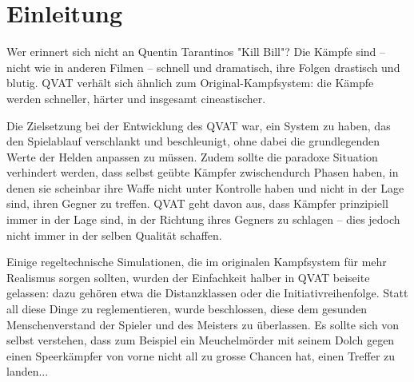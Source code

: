 %

\chapter{Einleitung}
Wer erinnert sich nicht an Quentin Tarantinos "Kill Bill"? Die Kämpfe sind – nicht wie in anderen Filmen – schnell und dramatisch, ihre Folgen drastisch und blutig. QVAT verhält sich ähnlich zum Original-Kampfsystem: die Kämpfe werden schneller, härter und insgesamt cineastischer.



Die Zielsetzung bei der Entwicklung des QVAT war, ein System zu haben, das den Spielablauf verschlankt und beschleunigt, ohne dabei die grundlegenden Werte der Helden anpassen zu müssen.
Zudem sollte die paradoxe Situation verhindert werden, dass selbst geübte Kämpfer zwischendurch Phasen haben, in denen sie scheinbar ihre Waffe nicht unter Kontrolle haben und nicht in der Lage sind, ihren Gegner zu treffen.
QVAT geht davon aus, dass Kämpfer prinzipiell immer in der Lage sind, in der Richtung ihres Gegners zu schlagen – dies jedoch nicht immer in der selben Qualität schaffen.

Einige regeltechnische Simulationen, die im originalen Kampfsystem für mehr Realismus sorgen sollten, wurden der Einfachkeit halber in QVAT beiseite gelassen: dazu gehören etwa die Distanzklassen oder die Initiativreihenfolge.
Statt all diese Dinge zu reglementieren, wurde beschlossen, diese dem gesunden Menschenverstand der Spieler und des Meisters zu überlassen.
Es sollte sich von selbst verstehen, dass zum Beispiel ein Meuchelmörder mit seinem Dolch gegen einen Speerkämpfer von vorne nicht all zu grosse Chancen hat, einen Treffer zu landen...



